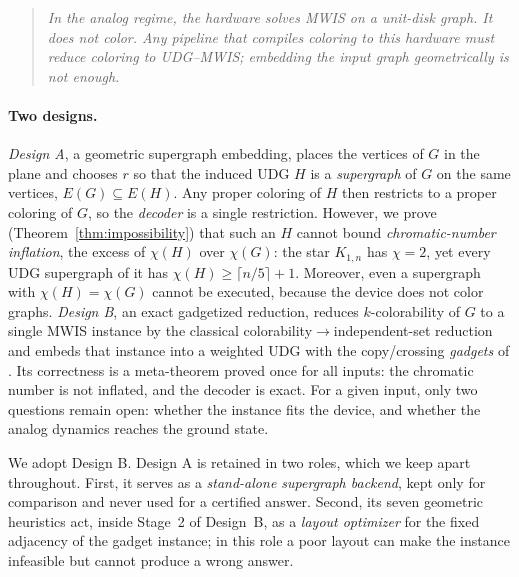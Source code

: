 \documentclass[a4paper,fleqn]{cas-sc}
\begin{document}
\begin{quote}
\itshape
In the analog regime, the hardware solves MWIS on a unit-disk graph. It does
not color. Any pipeline that compiles coloring to this hardware must reduce coloring
to UDG--MWIS; embedding the input graph geometrically is not enough.
\end{quote}

\paragraph{Two designs.} \emph{Design A}, a geometric supergraph embedding, places
the vertices of $G$ in the plane and chooses $r$ so that the induced UDG $H$ is a
\emph{supergraph} of $G$ on the same vertices, $E(G)\subseteq E(H)$. Any proper
coloring of $H$ then restricts to a proper coloring of $G$, so the \emph{decoder} is a
single restriction. However, we prove (Theorem~\ref{thm:impossibility}) that such an
$H$ cannot bound \emph{chromatic-number inflation}, the excess of $\chi(H)$ over
$\chi(G)$: the star $K_{1,n}$ has $\chi=2$, yet every UDG supergraph of it has
$\chi(H)\ge\lceil n/5\rceil+1$. Moreover, even a supergraph with $\chi(H)=\chi(G)$
cannot be executed, because the device does not color graphs. \emph{Design B}, an
exact gadgetized reduction, reduces $k$-colorability of $G$ to a single MWIS instance
by the classical colorability$\to$independent-set reduction and embeds that instance
into a weighted UDG with the copy/crossing \emph{gadgets} of \citet{Nguyen2023}. Its
correctness is a meta-theorem proved once for all inputs: the chromatic number is not
inflated, and the decoder is exact. For a given input, only two questions remain open:
whether the instance fits the device, and whether the analog dynamics reaches the
ground state.

We adopt Design B. Design A is retained in two roles, which we keep apart throughout.
First, it serves as a \emph{stand-alone supergraph backend}, kept only for comparison
and never used for a certified answer. Second, its seven geometric heuristics act,
inside Stage~2 of Design~B, as a \emph{layout optimizer} for the fixed adjacency of
the gadget instance; in this role a poor layout can make the instance infeasible but
cannot produce a wrong answer.
\end{document}
